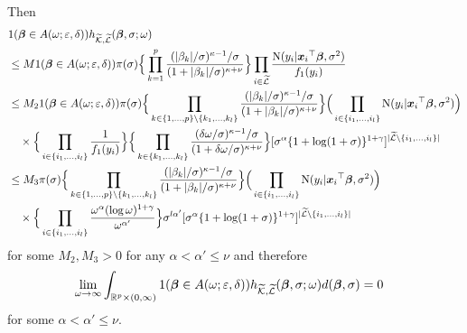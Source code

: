 \documentclass[12pt]{article}
\def\ep{{\varepsilon}}
\def\si{{\sigma}}
\def\al{{\alpha}}
\def\be{{\beta}}
\def\ga{{\gamma}}
\def\de{{\delta}}
\def\ep{{\varepsilon}}
\def\si{{\sigma}}
\def\om{{\omega}}
\def\non{{\nonumber}}
\def\Lc{{\cal L}}
\def\Kc{{\cal K}}
\def\al{{\alpha}}
\def\be{{\beta}}
\def\ga{{\gamma}}
\def\de{{\delta}}
\def\ep{{\varepsilon}}
\def\si{{\sigma}}
\def\om{{\omega}}
\def\ka{{\kappa}}
\def\bbe{{\text{\boldmath $\beta$}}}
\def\x{{\text{\boldmath $x$}}}
\def\Lc{{\cal L}}
\def\Kc{{\cal K}}
\def\non{{\nonumber}}
\begin{document}
Then 
\begin{align}
&1( \bbe \in A( \om ; \ep , \de )) h_{\widetilde{\Kc } , \widetilde{\Lc }} ( \bbe , \si ; \om ) \non \\
&\le M 1( \bbe \in A( \om ; \ep , \de )) \pi ( \si ) \Big\{ \prod_{k = 1}^{p} {(| \be _k | / \si )^{\ka - 1} / \si \over (1 + | \be _k | / \si )^{\ka + \nu }} \Big\} \prod_{i \in \widetilde{\Lc }} {{\rm{N}} ( y_i | {\x _i}^{\top } \bbe , \si ^2 ) \over f_1 ( y_i )} \non \\
&\le M_2 1( \bbe \in A( \om ; \ep , \de )) \pi ( \si ) \Big\{ \prod_{k \in \{ 1, \dots , p \} \setminus \{ k_1 , \dots , k_l \} } {(| \be _k | / \si )^{\ka - 1} / \si \over (1 + | \be _k | / \si )^{\ka + \nu }} \Big\} \Big( \prod_{i \in \{ i_1 , \dots , i_l \} } {\rm{N}} ( y_i | {\x _i}^{\top } \bbe , \si ^2 ) \Big) \non \\
&\quad \times \Big\{ \prod_{i \in \{ i_1 , \dots , i_l \} } {1 \over f_1 ( y_i )} \Big\} \Big\{ \prod_{k \in \{ k_1 , \dots , k_l \} } {( \de \om / \si )^{\ka - 1} / \si \over (1 + \de \om / \si )^{\ka + \nu }} \Big\} [ \si ^{\al } \{ 1 + \log (1 + \si ) \} ^{1 + \ga } ]^{| \widetilde{\Lc } \setminus \{ i_1 , \dots , i_l \} |} \non \\
&\le M_3 \pi ( \si ) \Big\{ \prod_{k \in \{ 1, \dots , p \} \setminus \{ k_1 , \dots , k_l \} } {(| \be _k | / \si )^{\ka - 1} / \si \over (1 + | \be _k | / \si )^{\ka + \nu }} \Big\} \Big( \prod_{i \in \{ i_1 , \dots , i_l \} } {\rm{N}} ( y_i | {\x _i}^{\top } \bbe , \si ^2 ) \Big) \non \\
&\quad \times \Big\{ \prod_{i \in \{ i_1 , \dots , i_l \} } {\om ^{\al } ( \log \om )^{1 + \ga } \over \om ^{{\al }'}} \Big\} \si ^{l {\al }'} [ \si ^{\al } \{ 1 + \log (1 + \si ) \} ^{1 + \ga } ]^{| \widetilde{\Lc } \setminus \{ i_1 , \dots , i_l \} |} \non 
\end{align}
for some $M_2 , M_3 > 0$ for any $\al < {\al }' \le \nu $ and therefore 
\begin{align}
&\lim_{\om \to \infty } \int_{\mathbb{R} ^p \times (0, \infty )} 1( \bbe \in A( \om ; \ep , \de )) h_{\widetilde{\Kc } , \widetilde{\Lc }} ( \bbe , \si ; \om ) d( \bbe , \si ) = 0 \non 
\end{align}
for some $\al < {\al }' \le \nu $. 
\end{document}

